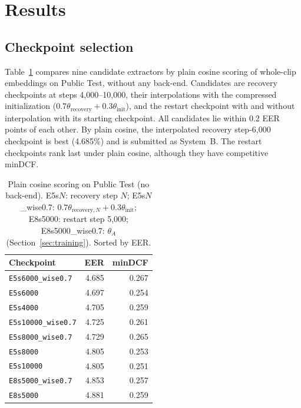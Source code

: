 \documentclass[11pt]{article}
\begin{document}
\section{Results}
\subsection{Checkpoint selection}
\label{sec:selection}
Table~\ref{tab:cosine} compares nine candidate extractors by plain cosine scoring of whole-clip embeddings on Public Test, without any back-end. Candidates are recovery checkpoints at steps 4,000--10,000, their interpolations with the compressed initialization ($0.7\theta_{\mathrm{recovery}}+0.3\theta_{\mathrm{init}}$), and the restart checkpoint with and without interpolation with its starting checkpoint. All candidates lie within 0.2 EER points of each other. By plain cosine, the interpolated recovery step-6,000 checkpoint is best (4.685\%) and is submitted as System~B. The restart checkpoints rank last under plain cosine, although they have competitive minDCF.

\begin{table}[t]
\centering
\small
\setlength{\tabcolsep}{3.5pt}
\begin{tabular}{@{}lrr@{}}
\toprule
Checkpoint & EER & minDCF \\
\midrule
\nolinkurl{E5s6000_wise0.7}  & 4.685 & 0.267 \\
\nolinkurl{E5s6000}          & 4.697 & 0.254 \\
\nolinkurl{E5s4000}          & 4.705 & 0.259 \\
\nolinkurl{E5s10000_wise0.7} & 4.725 & 0.261 \\
\nolinkurl{E5s8000_wise0.7}  & 4.729 & 0.265 \\
\nolinkurl{E5s8000}          & 4.805 & 0.253 \\
\nolinkurl{E5s10000}         & 4.805 & 0.251 \\
\nolinkurl{E8s5000_wise0.7}  & 4.853 & 0.257 \\
\nolinkurl{E8s5000}          & 4.881 & 0.259 \\
\bottomrule
\end{tabular}
\caption{Plain cosine scoring on Public Test (no back-end). E5s$N$: recovery step $N$; E5s$N$\_wise0.7: $0.7\theta_{\mathrm{recovery},N}+0.3\theta_{\mathrm{init}}$; E8s5000: restart step 5,000; E8s5000\_wise0.7: $\theta_A$ (Section~\ref{sec:training}). Sorted by EER.}
\label{tab:cosine}
\end{table}
\end{document}
